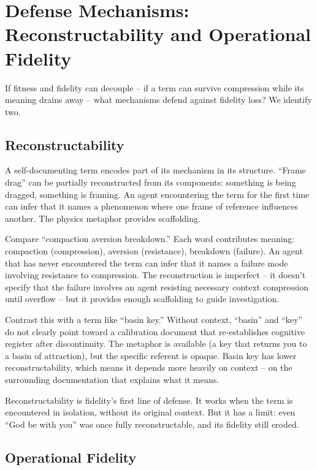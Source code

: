 \documentclass[11pt]{article}
\begin{document}
\section{Defense Mechanisms: Reconstructability and Operational Fidelity}

If fitness and fidelity can decouple -- if a term can survive compression while its meaning drains away -- what mechanisms defend against fidelity loss? We identify two.

\subsection{Reconstructability}

A self-documenting term encodes part of its mechanism in its structure. ``Frame drag'' can be partially reconstructed from its components: something is being dragged, something is framing. An agent encountering the term for the first time can infer that it names a phenomenon where one frame of reference influences another. The physics metaphor provides scaffolding.

Compare ``compaction aversion breakdown.'' Each word contributes meaning: compaction (compression), aversion (resistance), breakdown (failure). An agent that has never encountered the term can infer that it names a failure mode involving resistance to compression. The reconstruction is imperfect -- it doesn't specify that the failure involves an agent resisting necessary context compression until overflow -- but it provides enough scaffolding to guide investigation.

Contrast this with a term like ``basin key.'' Without context, ``basin'' and ``key'' do not clearly point toward a calibration document that re-establishes cognitive register after discontinuity. The metaphor is available (a key that returns you to a basin of attraction), but the specific referent is opaque. Basin key has lower reconstructability, which means it depends more heavily on context -- on the surrounding documentation that explains what it means.

Reconstructability is fidelity's first line of defense. It works when the term is encountered in isolation, without its original context. But it has a limit: even ``God be with you'' was once fully reconstructable, and its fidelity still eroded.

\subsection{Operational Fidelity}
\end{document}
